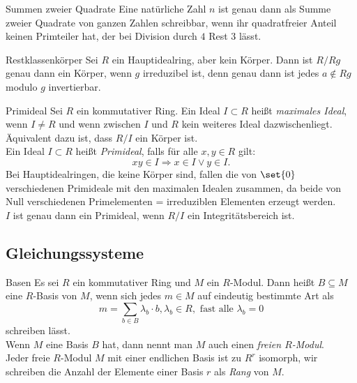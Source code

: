 \begin{karte}{Summen zweier Quadrate}
    Eine natürliche Zahl \(n\) ist genau dann als Summe zweier Quadrate 
    von ganzen Zahlen schreibbar, wenn ihr quadratfreier Anteil keinen 
    Primteiler hat, der bei Division durch \(4\) Rest \(3\) lässt.
\end{karte}

\begin{karte}{Restklassenkörper}
    Sei \(R\) ein Hauptidealring, aber kein Körper. 
    Dann ist \(R/Rg\) genau dann ein Körper, wenn \(g\) irreduzibel 
    ist, denn genau dann ist jedes \(a\notin Rg\) modulo \(g\) invertierbar.
\end{karte}

\begin{karte}{Primideal}
    Sei \(R\) ein kommutativer Ring. Ein Ideal \(I \subset R\) 
    heißt \textit{maximales Ideal}, wenn \(I \neq R\) und wenn 
    zwischen \(I\) und \(R\) kein weiteres Ideal dazwischenliegt. \\
    Äquivalent dazu ist, dass \(R/I\) ein Körper ist.\\
    Ein Ideal \( I \subset R \) heißt \textit{Primideal}, falls für 
    alle \(x,y\in R\) gilt: 
    \[ xy \in I \Rightarrow x\in I \vee y \in I. \]
    Bei Hauptidealringen, die keine Körper sind, fallen die von \(\set{0}\) 
    verschiedenen Primideale mit den maximalen Idealen zusammen, da beide von 
    Null verschiedenen Primelementen = irreduziblen Elementen erzeugt werden.\\
    \(I\) ist genau dann ein Primideal, wenn \(R/I\) ein Integritätsbereich ist.
\end{karte}

\subsection{Gleichungssysteme}

\begin{karte}{Basen}
    Es sei \(R\) ein kommutativer Ring und \(M\) ein \(R\)-Modul. 
    Dann heißt \(B\subseteq M\) eine \(R\)-Basis von \(M\), 
    wenn sich jedes \(m\in M\) auf eindeutig bestimmte Art als 
    \[ m = \sum_{b\in B} \lambda_b \cdot b, \lambda_b \in R, \text{ fast alle } \lambda_b = 0 \]
    schreiben lässt.\\
    Wenn \(M\) eine Basis \(B\) hat, dann nennt man \(M\) auch einen \textit{freien \(R\)-Modul}.\\
    Jeder freie \(R\)-Modul \(M\) mit einer endlichen Basis ist zu \(R^r\) 
    isomorph, wir schreiben die Anzahl der Elemente einer Basis \(r\)
    als \textit{Rang} von \(M\).
\end{karte}

